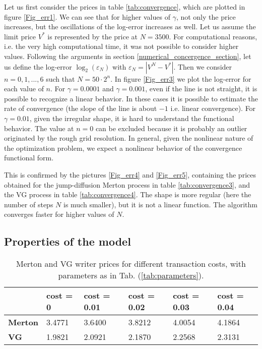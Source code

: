 Let us first consider the prices in table \ref{tab:convergence}, which are plotted in figure \ref{Fig_err1}. 
We can see that for higher values of $\gamma$, not only the price increases, but the oscillations of the log-error increases as well.
Let us assume the limit price $V^*$ is represented by the price at $N=3500$. 
For computational reasons, i.e. the very high computational time, it was not possible to consider higher values. 
Following the arguments in section \ref{numerical_concergence_section}, let us define the log-error $\log_2 (\varepsilon_N)$ with $\varepsilon_N = |V^N - V^*|$. 
Then we consider $n = 0,1,...,6$ such that $N = 50\cdot2^n$.
In figure \ref{Fig_err3} we plot the log-error for each value of $n$.
For $\gamma=0.0001$ and $\gamma=0.001$, even if the line is not straight, it is possible to recognize a linear behavior.  
In these cases it is possible to estimate the rate of convergence (the slope of the line is about $-1$ i.e. linear convergence).  
For $\gamma=0.01$, given the irregular shape, it is hard to understand the functional behavior. 
The value at $n=0$ can be excluded because it is probably an outlier originated by the rough grid resolution.
In general, given the nonlinear nature of the optimization problem, we expect a nonlinear behavior of the convergence functional form.

This is confirmed by the pictures \ref{Fig_err4} and \ref{Fig_err5}, 
containing the prices obtained for the jump-diffusion Merton process in table \ref{tab:convergence3}, and the VG process in table \ref{tab:convergence4}.
The shape is more regular (here the number of steps $N$ is much smaller), but it is not a linear function. 
The algorithm converges faster for higher values of $N$.



\subsection{Properties of the model}\label{properties_model}

\begin{table}[ht]
  \centering
 \begin{tabular}{llllll}
\toprule
 & cost = 0 & cost = 0.01 & cost = 0.02 & cost = 0.03 & cost = 0.04  \\
\midrule
\textbf{Merton} & 3.4771 & 3.6400 & 3.8212 & 4.0054 & 4.1864 \\
\textbf{VG} & 1.9821 & 2.0921 & 2.1870 & 2.2568 & 2.3131 \\
\bottomrule
\end{tabular}
  \caption{Merton and VG writer prices for different transaction costs, with parameters as in Tab. (\ref{tab:parameters}). }
  \label{tab:costs}
\end{table}


